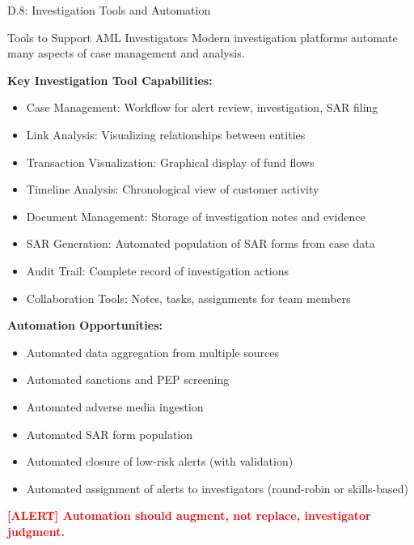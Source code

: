 \documentclass[11pt,a4paper]{beamer}
\newcommand{\redflag}[1]{\textcolor{red}{\textbf{[ALERT] #1}}}
\begin{document}
\begin{frame}{D.8: Investigation Tools and Automation}
	\begin{block}{Tools to Support AML Investigators}
		Modern investigation platforms automate many aspects of case management and analysis.
	\end{block}
	\textbf{Key Investigation Tool Capabilities:}
	\begin{itemize}
		\item Case Management: Workflow for alert review, investigation, SAR filing
		\item Link Analysis: Visualizing relationships between entities
		\item Transaction Visualization: Graphical display of fund flows
		\item Timeline Analysis: Chronological view of customer activity
		\item Document Management: Storage of investigation notes and evidence
		\item SAR Generation: Automated population of SAR forms from case data
		\item Audit Trail: Complete record of investigation actions
		\item Collaboration Tools: Notes, tasks, assignments for team members
	\end{itemize}
	\textbf{Automation Opportunities:}
	\begin{itemize}
		\item Automated data aggregation from multiple sources
		\item Automated sanctions and PEP screening
		\item Automated adverse media ingestion
		\item Automated SAR form population
		\item Automated closure of low-risk alerts (with validation)
		\item Automated assignment of alerts to investigators (round-robin or skills-based)
	\end{itemize}
	\redflag{Automation should augment, not replace, investigator judgment.}
\end{frame}
\end{document}
